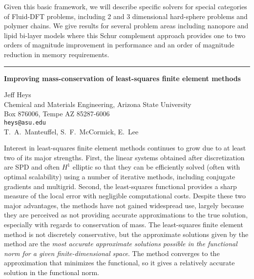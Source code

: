 \documentclass[twosided]{report}
\begin{document}
Given this basic framework, we will describe specific
solvers for special categories of Fluid-DFT problems,
including 2 and 3 dimensional hard-sphere problems and
polymer chains. We give results for several problem areas
including nanopore and lipid bi-layer models where this
Schur complement approach provides one to two orders of
magnitude improvement in performance and an order of
magnitude reduction in memory requirements.



	\begin{center} \rule{6in}{1pt} \end{center}

\begin{center}
{\large			%
{\bf Improving mass-conservation of least-squares finite element methods}}

	Jeff Heys \\
	Chemical and Materials Engineering, Arizona State University \\
	Box 876006, Tempe AZ 85287-6006 \\
	{\tt heys@asu.edu} \\
	T.~A.~Manteuffel, S.~F.~McCormick, E.~Lee
\end{center}
Interest in least-squares finite element methods continues
to grow due to at least two of its major strengths. First,
the linear systems obtained after discretization are SPD and
often $H^1$ elliptic so that they can be efficiently solved
(often with optimal scalability) using a number of iterative
methods, including conjugate gradients and multigrid.
Second, the least-squares functional provides a sharp
measure of the local error with negligible computational
costs. Despite these two major advantages, the methods have
not gained widespread use, largely because they are
perceived as not providing accurate approximations to the
true solution, especially with regards to conservation of
mass.
The least-squares finite element method is not
discretely conservative, but the approximate solutions given
by the method are the \emph{most accurate approximate
solutions possible in the functional norm for a given
finite-dimensional space}. The method converges to the
approximation that minimizes the functional, so it gives a
relatively accurate solution in the functional norm.
\end{document}
